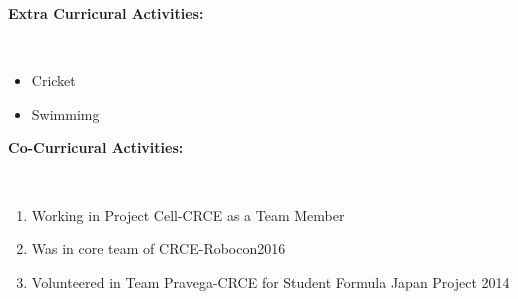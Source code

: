 \documentclass[a4paper]{article}
\begin{document}
\begin{flushleft}
				\begin{Large}\vspace{0.1in}\textbf{Extra Curricural Activities:}\end{Large}\\
				\begin{itemize}
					\item Cricket
					\item Swimmimg
				\end{itemize}
				
\begin{Large}\vspace{0.1in}\textbf{Co-Curricural Activities:}\end{Large}\\
\begin{enumerate}
	\item Working in Project Cell-CRCE as a Team Member
	\item Was in core team of CRCE-Robocon2016
	\item Volunteered in Team Pravega-CRCE for Student Formula Japan Project 2014
\end{enumerate}


			


    	
  	
 	
 	
 	
 \end{flushleft}

	

	
\end{document}
